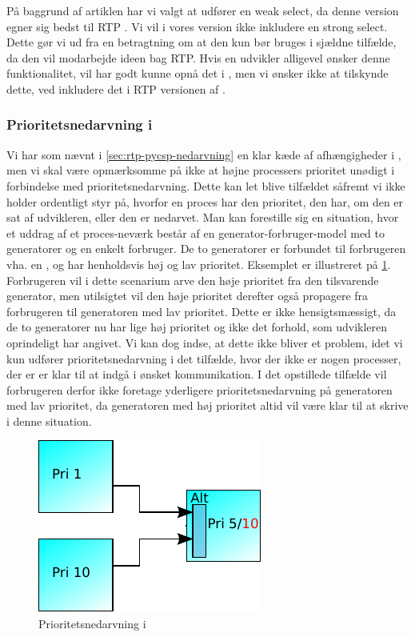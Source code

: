 På baggrund af artiklen har vi valgt at  udfører en weak select, da denne version egner sig bedst til RTP . Vi vil i vores version ikke inkludere en strong select. Dette gør vi ud fra en betragtning om at den kun bør bruges i sjældne tilfælde,  da den vil modarbejde ideen bag RTP. Hvis en udvikler alligevel ønsker denne funktionalitet, vil har godt kunne opnå det i \pycsp, men vi ønsker ikke at tilskynde dette, ved inkludere det i RTP versionen af \pycsp.

\subsubsection{Prioritetsnedarvning i }
Vi har som nævnt i \cref{sec:rtp-pycsp-nedarvning} en klar kæde af afhængigheder i \pycsp, men vi skal være opmærksomme på ikke at højne processers prioritet unødigt i forbindelse med prioritetsnedarvning. Dette kan let blive tilfældet såfremt vi ikke holder ordentligt styr på, hvorfor en proces har den prioritet, den har, om den er sat af udvikleren, eller den er nedarvet. Man kan forestille sig en situation, hvor et uddrag af et proces-neværk består af en generator-forbruger-model med to generatorer og en enkelt forbruger. De to generatorer er forbundet til forbrugeren vha. en , og har henholdsvis høj og lav prioritet. Eksemplet er illustreret på \cref{fig:alt-inheritance}. Forbrugeren vil i dette scenarium arve den høje prioritet fra den tilsvarende generator, men utilsigtet vil den høje prioritet derefter også propagere fra forbrugeren til generatoren med lav prioritet. Dette er ikke hensigtsmæssigt, da de to generatorer nu har lige høj prioritet og ikke det forhold, som udvikleren oprindeligt har angivet. Vi kan dog indse, at dette ikke bliver et problem, idet vi kun udfører prioritetsnedarvning i det tilfælde, hvor der ikke er nogen processer, der er er klar til at indgå i ønsket kommunikation. I det opstillede tilfælde vil forbrugeren derfor ikke foretage yderligere prioritetsnedarvning på generatoren med lav prioritet, da generatoren med høj prioritet altid vil være klar til at skrive i denne situation. 

\begin{figure}
 \begin{center}
  \includegraphics[scale=1.00]{images/alt-inheritance}
  \caption{Prioritetsnedarvning i }
  \label{fig:alt-inheritance}
  \end{center}
\end{figure}

